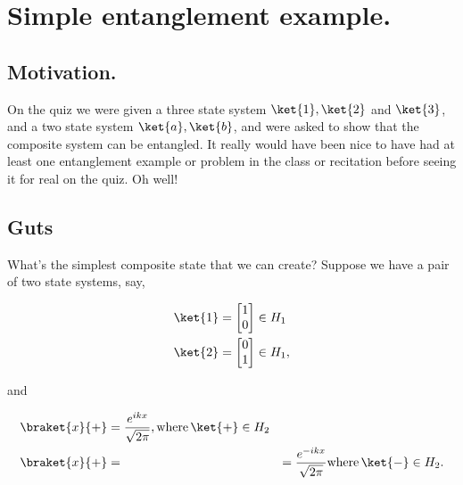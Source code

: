 
%

\chapter{Simple entanglement example.}
\label{chap:entangledSimpleExample}
{}
\date{Sept 1, 2011}

\beginArtWithToc

\section{Motivation.}

On the quiz we were given a three state system $\ket{1}, \ket{2}$ and $\ket{3}$, and a two state system $\ket{a}, \ket{b}$, and were asked to show that the composite system can be entangled.  It really would have been nice to have had at least one entanglement example or problem in the class or recitation before seeing it for real on the quiz.  Oh well!

\section{Guts}

What's the simplest composite state that we can create?  Suppose we have a pair of two state systems, say,

\begin{align}\label{eqn:entangledSimpleExample:n}
\ket{1} 
&= 
\begin{bmatrix}
1 \\
0
\end{bmatrix} \in H_1 \\
\ket{2} 
&= 
\begin{bmatrix}
0 \\
1 
\end{bmatrix} \in H_1,
\end{align}

and

\begin{align}\label{eqn:entangledSimpleExample:n}
\braket{x}{+} 
&= 
\frac{e^{i k x}}{\sqrt{2\pi}},
\text{where}\, \ket{+} \in H_2 \\
\braket{x}{+} 
&= 
&= 
\frac{e^{-i k x}}{\sqrt{2\pi}}
\text{where}\, \ket{-} \in H_2.
\end{align}

